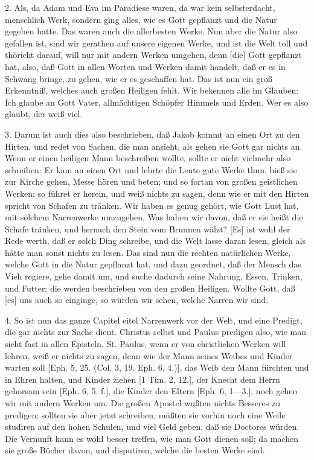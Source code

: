 2. Als, da Adam und Eva im Paradiese waren, da war kein selbsterdacht, menschlich Werk, sondern ging alles, wie es Gott gepflanzt und die Natur gegeben hatte. Das waren auch die allerbesten Werke. Nun aber die Natur also gefallen ist, sind wir gerathen auf unsere eigenen Werke, und ist die Welt toll und thöricht darauf, will nur mit andern Werken umgehen, denn [die]
Gott gepflanzt hat, also, daß Gott in allen Worten und Werken damit handelt, daß er es in Schwang bringe, zu gehen, wie er es geschaffen hat. Das ist nun ein groß Erkenntniß, welches auch großen Heiligen fehlt. Wir bekennen alle im Glauben: Ich glaube an Gott Vater, allmächtigen Schöpfer Himmels und Erden. Wer es also glaubt, der weiß viel.

3. Darum ist auch dies also beschrieben, daß Jakob kommt an einen Ort zu den Hirten, und redet von Sachen, die man ansieht, als gehen sie Gott gar nichts an. Wenn er einen heiligen Mann beschreiben wollte, sollte er nicht vielmehr also schreiben: Er kam an einen Ort und lehrte die Leute gute Werke thun, hieß sie zur Kirche gehen, Messe hören und beten; und so fortan von großen geistlichen Werken: so führet er herein, und weiß nichts zu sagen, denn wie er mit den Hirten spricht von Schafen zu tränken. Wir haben es genug gehört, wie Gott Lust hat, mit solchem Narrenwerke umzugehen. Was haben wir davon, daß er sie heißt die Schafe tränken, und hernach den Stein vom Brunnen wälzt? [Es] ist wohl der Rede werth, daß er solch Ding schreibe, und die Welt lasse daran lesen, gleich als hätte man sonst nichts zu lesen. Das sind nun die rechten natürlichen Werke, welche Gott in die Natur gepflanzt hat, und dazu geordnet, daß der Mensch das Vieh regiere, gehe damit um, und suche dadurch seine Nahrung, Essen, Trinken, und Futter; die werden beschrieben von den großen Heiligen. Wollte Gott, daß [es] uns auch so einginge, so würden wir sehen, welche Narren wir sind.

4. So ist nun das ganze Capitel eitel Narrenwerk vor der Welt, und eine Predigt, die gar nichts zur Sache dient. Christus selbst und Paulus predigen also, wie man sieht fast in allen Episteln. St. Paulus, wenn er von christlichen Werken will lehren, weiß er nichts zu sagen, denn wie der Mann seines Weibes und Kinder warten soll [Eph. 5, 25. (Col. 3, 19. Eph. 6, 4.)], das Weib den Mann fürchten und in Ehren halten, und Kinder ziehen [1 Tim. 2, 12.], der Knecht dem Herrn gehorsam sein [Eph. 6, 5. f.], die Kinder den Eltern [Eph. 6, 1—3.], noch gehen wir mit andern Werken um. Die großen Apostel wußten nichts Besseres zu predigen; sollten sie aber jetzt schreiben, müßten sie vorhin noch eine Weile studiren auf den hohen Schulen, und viel Geld geben, daß sie Doctores würden. Die Vernunft kann es wohl besser treffen, wie man Gott dienen soll; da machen sie große Bücher davon, und disputiren, welche die besten Werke sind.

